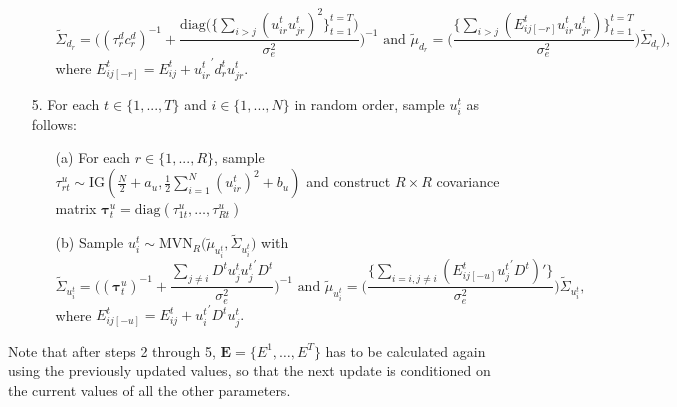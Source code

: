 \documentclass[a4paper]{article}
\begin{document}
\begin{itemize}
\begin{enumerate}
			$$\tilde{\Sigma}_{d_r} = \Big((\tau_r^d{c_r^d})^{-1}+\frac{\mbox{diag}\big(\{\sum_{i>j}({u^t_{ir}u^t_{jr}})^2\}_{t=1}^{t=T}\big)}{\sigma_e^2}\Big)^{-1} \mbox{ and } \tilde{\mu}_{d_r} =  \Big(\frac{\{\sum_{i>j}(E^{t}_{ij[-r]}u^t_{ir}u^t_{jr})\}_{t=1}^{t=T}}{\sigma_e^2}\Big)\tilde{\Sigma}_{d_r}),$$
			where $E^{t}_{ij[-r]}=E^t_{ij}+{u^t_{ir}}^\prime d^t_{r}u^t_{jr}$.
		\end{enumerate}		
		\item [5.] For each $t \in \{1,...,T\}$ and $i \in \{1,...,N\}$ in random order, sample $u^t_{i}$ as follows:
		\begin{enumerate}
			\item[(a)] For each $r \in \{1,...,R\}$, sample $\tau_{rt}^{u} \sim \mbox{IG}(\frac{N}{2}+a_u, \frac{1}{2}\sum\limits_{i=1}^N (u^t_{ir})^2 + b_u)$ and construct $R\times R$ covariance matrix $\boldsymbol{\tau}^u_t = \mbox{diag}(\tau_{1t}^{u},\ldots, \tau_{Rt}^{u})$
					\item [(b)] Sample $u^t_{i}\sim \mbox{MVN}_R\big(\tilde{\mu}_{u^t_{i}}, \tilde{\Sigma}_{u^t_{i}} \big)$ with 
			$$\tilde{\Sigma}_{u^t_{i}} = \Big((\boldsymbol{\tau}^u_t)^{-1}+\frac{\sum_{j\neq i}D^tu^t_{j}{u^t_{j}}^\prime D^t}{\sigma_e^2}\Big)^{-1}\mbox{ and } \tilde{\mu}_{u^t_{i}} = \Big(\frac{\{\sum_{i=i, j\neq i}(E^{t}_{ij[-u]}{u^t_{j}}^\prime D^t)'\}}{{\sigma_e^2}}\Big)\tilde{\Sigma}_{u^t_{i}},$$ 
			where $E^{t}_{ij[-u]}=E^t_{ij}+{u^t_{i}}^\prime D^tu^t_{j}.$
		\end{enumerate}			
	\end{itemize}
	Note that after steps 2 through 5, $\mathbf{E} = \{E^1,\ldots, E^T\}$ has to be calculated again using the previously updated values, so that the next update is conditioned on the current values of all the other parameters. 
\end{document}
